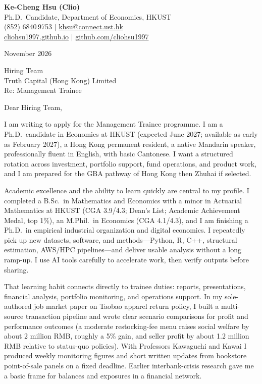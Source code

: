 \documentclass[11pt,letterpaper]{article}
\begin{document}
\noindent
{\bfseries Ke-Cheng Hsu (Clio)}\\
Ph.D.\ Candidate, Department of Economics, HKUST\\
(852) 6840\,9753 \quad $|$ \quad \href{mailto:khsu@connect.ust.hk}{khsu@connect.ust.hk}\\
\href{https://cliohsu1997.github.io/}{cliohsu1997.github.io} \quad $|$ \quad \href{https://github.com/cliohsu1997}{github.com/cliohsu1997}

\vspace{0.4em}
 November 2026

\vspace{0.3em}
\noindent
Hiring Team\\
Truth Capital (Hong Kong) Limited\\
Re: Management Trainee

\vspace{0.15em}
Dear Hiring Team,

I am writing to apply for the Management Trainee programme. I am a Ph.D.\ candidate in Economics at HKUST (expected June 2027; available as early as February 2027), a Hong Kong permanent resident, a native Mandarin speaker, professionally fluent in English, with basic Cantonese. I want a structured rotation across investment, portfolio support, fund operations, and product work, and I am prepared for the GBA pathway of Hong Kong then Zhuhai if selected.

Academic excellence and the ability to learn quickly are central to my profile. I completed a B.Sc.\ in Mathematics and Economics with a minor in Actuarial Mathematics at HKUST (CGA 3.9/4.3; Dean's List; Academic Achievement Medal, top 1\%), an M.Phil.\ in Economics (CGA 4.1/4.3), and I am finishing a Ph.D.\ in empirical industrial organization and digital economics. I repeatedly pick up new datasets, software, and methods---Python, R, C++, structural estimation, AWS/HPC pipelines---and deliver usable analysis without a long ramp-up. I use AI tools carefully to accelerate work, then verify outputs before sharing.

That learning habit connects directly to trainee duties: reports, presentations, financial analysis, portfolio monitoring, and operations support. In my sole-authored job market paper on Taobao apparel return policy, I built a multi-source transaction pipeline and wrote clear scenario comparisons for profit and performance outcomes (a moderate restocking-fee menu raises social welfare by about 2 million RMB, roughly a 5\% gain, and seller profit by about 1.2 million RMB relative to status-quo policies). With Professors Kawaguchi and Kawai I produced weekly monitoring figures and short written updates from bookstore point-of-sale panels on a fixed deadline. Earlier interbank-crisis research gave me a basic frame for balances and exposures in a financial network.
\end{document}
